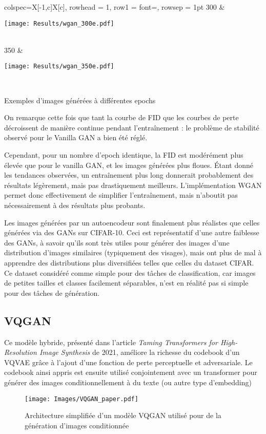 \documentclass{article}
\begin{document}
\begin{minipage}{0.48\textwidth}
\begin{table}[H]
\begin{tblr}{
        colspec={X[-1,c]X[c]},
        rowhead = 1,
        row{1} = {font=\bfseries},
        rowsep = 1pt
        }
        300 & \begin{minipage}{\linewidth}\texttt{[image: Results/wgan\_300e.pdf]}\end{minipage}\\
        350 & \begin{minipage}{\linewidth}\texttt{[image: Results/wgan\_350e.pdf]}\end{minipage}\\
        \end{tblr}
        \caption{Exemples d'images générées à différentes epochs}
    \end{table}
\end{minipage}

On remarque cette fois que tant la courbe de FID que les courbes de perte décroissent de manière continue pendant l'entraînement : le problème de stabilité observé pour le Vanilla GAN a bien été réglé.\par
Cependant, pour un nombre d'epoch identique, la FID est modérément plus élevée que pour le vanilla GAN, et les images générées plus floues. Étant donné les tendances observées, un entraînement plus long donnerait probablement des résultats légèrement, mais pas drastiquement meilleurs. L'implémentation WGAN permet donc effectivement de simplifier l'entraînement, mais n'aboutit pas nécessairement à des résultats plus probants. \par
Les images générées par un autoencodeur sont finalement plus réalistes que celles générées via des GANs sur CIFAR-10. Ceci est représentatif d'une autre faiblesse des GANs, à savoir qu'ils sont très utiles pour générer des images d'une distribution d'images similaires (typiquement des visages), mais ont plus de mal à apprendre des distributions plus diversifiées telles que celles du dataset CIFAR. Ce dataset considéré comme simple pour des tâches de classification, car images de petites tailles et classes facilement séparables, n'est en réalité pas si simple pour des tâches de génération.

\subsection{VQGAN}

Ce modèle hybride, présenté dans l'article \textit{Taming Transformers for High-Resolution Image Synthesis} \cite{VQGAN} de 2021, améliore la richesse du codebook d'un VQVAE grâce à l'ajout d'une fonction de perte perceptuelle et adversariale. Le codebook ainsi appris est ensuite utilisé conjointement avec un transformer pour générer des images conditionnellement à du texte (ou autre type d'embedding)
\begin{figure}[H]
    \centering
    \texttt{[image: Images/VQGAN\_paper.pdf]}
    \caption{Architecture simplifiée d'un modèle VQGAN utilisé pour de la génération d'images conditionnée}
\end{figure}
\end{document}
